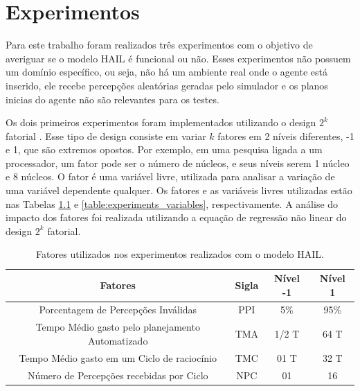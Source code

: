 \chapter{Experimentos}

Para este trabalho foram realizados três experimentos com o objetivo de averiguar se o modelo HAIL é funcional ou não. Esses experimentos não possuem um domínio específico, ou seja, não há um ambiente real onde o agente está inserido, ele recebe percepções aleatórias geradas pelo simulador e os planos inicias do agente não são relevantes para os testes.

Os dois primeiros experimentos foram implementados utilizando o design $2^k$ fatorial \cite{jain1990art}. Esse tipo de design consiste em variar $k$ fatores em 2 níveis diferentes, -1 e 1, que são extremos opostos. Por exemplo, em uma pesquisa ligada a um processador, um fator pode ser o número de núcleos, e seus níveis serem 1 núcleo e 8 núcleos. O fator é uma variável livre, utilizada para analisar a variação de uma variável dependente qualquer. Os fatores e as variáveis livres utilizadas estão nas Tabelas \ref{table:experiments_factors} e \ref{table:experiments_variables}, respectivamente. A análise do impacto dos fatores foi realizada utilizando a equação de regressão não linear do design $2^k$ fatorial.

\begin{table}[h!]
    \begin{center}
        \caption{ Fatores utilizados nos experimentos realizados com o modelo HAIL. }
        \label{table:experiments_factors}
        \begin{tabular}{|c|c|c|c|}
        \hline
        \textbf{Fatores} & \textbf{Sigla} & \textbf{Nível -1} & \textbf{Nível 1} \\
        \hline
        Porcentagem de Percepções Inválidas & PPI & 5\% & 95\%  \\
        \hline
        Tempo Médio gasto pelo planejamento Automatizado & TMA & 1/2 T & 64 T \\
        \hline
        Tempo Médio gasto em um Ciclo de raciocínio & TMC & 01 T & 32 T \\
        \hline
        Número de Percepções recebidas por Ciclo & NPC & 01 & 16 \\
        \hline
    \end{tabular}{}
    \end{center}
\end{table}{}

